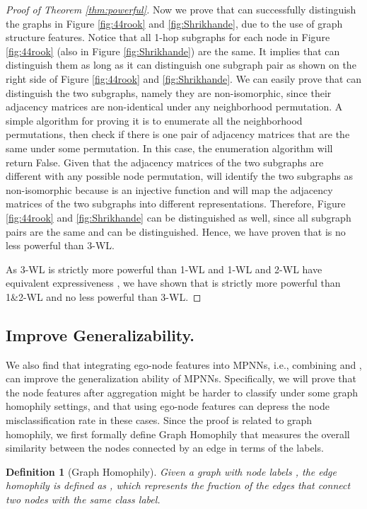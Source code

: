 \documentclass{article}
\theoremstyle{plain}
\newtheorem{definition}{Definition}[section]
\begin{document}
\begin{proof}[Proof of Theorem \ref{thm:powerful}]
Now we prove that  can successfully distinguish the graphs in Figure \ref{fig:44rook} and \ref{fig:Shrikhande}, due to the use of graph structure features.
Notice that all 1-hop subgraphs for each node in Figure \ref{fig:44rook} (also in Figure \ref{fig:Shrikhande}) are the same. It implies that  can distinguish them as long as it can distinguish one subgraph pair as shown on the right side of Figure \ref{fig:44rook} and \ref{fig:Shrikhande}.
We can easily prove that  can distinguish the two subgraphs, namely they are non-isomorphic, since their adjacency matrices are non-identical under any neighborhood permutation.
A simple algorithm for proving it is to enumerate all the neighborhood permutations, then check if there is one pair of adjacency matrices that are the same under some permutation. In this case, the enumeration algorithm will return False. 
Given that the adjacency matrices of the two subgraphs are different with any possible node permutation,  will identify the two subgraphs as non-isomorphic because  is an injective function and will map the adjacency matrices of the two subgraphs into different representations. 
Therefore, Figure \ref{fig:44rook} and \ref{fig:Shrikhande} can be distinguished as well, since all subgraph pairs are the same and can be distinguished.
Hence, we have proven that  is no less powerful than 3-WL.



As 3-WL is strictly more powerful than 1-WL \cite{sato2020survey} and 1-WL and 2-WL have equivalent expressiveness \cite{maron2019provably}, we have shown that  is strictly more powerful than 1\&2-WL and no less powerful than 3-WL.
\end{proof}



\subsection{Improve Generalizability.}
We also find that integrating ego-node features into MPNNs, i.e., combining  and , can improve the generalization ability of MPNNs. Specifically, we will prove that the node features after aggregation might be harder to classify under some graph homophily settings, and that using ego-node features can depress the node misclassification rate in these cases. Since the proof is related to graph homophily, we first formally define Graph Homophily  that measures the overall similarity between the nodes connected by an edge in terms of the labels.

\begin{definition}[Graph Homophily] \label{def:Homophily}
Given a graph  with node labels , the edge homophily is defined as
, which represents the fraction of the edges that connect two nodes with the same class label.
\end{definition}
\end{document}
